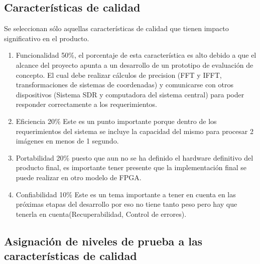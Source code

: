\documentclass[
11pt, %
]{charter}
\begin{document}
\subsection{Características de calidad}
\label{sec:org307bb59}

Se seleccionan sólo aquellas características de calidad que tienen impacto significativo en el producto.

\begin{enumerate}
\item Funcionalidad 50\%, el porcentaje de esta característica es alto debido a que el alcance del proyecto apunta a un desarrollo de un prototipo de evaluación de concepto. El cual debe realizar cálculos de precision (FFT y IFFT, transformaciones de sistemas de coordenadas) y comunicarse con otros dispositivos (Sistema SDR y computadora del sistema central) para poder responder correctamente a los requerimientos.
\item Eficiencia 20\% Este es un punto importante porque dentro de los requerimientos del sistema se incluye la capacidad del mismo para procesar 2 imágenes en menos de 1 segundo.
\item Portabilidad 20\% puesto que aun no se ha definido el hardware definitivo del producto final, es importante tener presente que la implementación final se puede realizar en otro modelo de FPGA.
\item Confiabilidad 10\% Este es un tema importante a tener en cuenta en las próximas etapas del desarrollo por eso no tiene tanto peso pero hay que tenerla en cuenta(Recuperabilidad, Control de errores).
\end{enumerate}


\subsection{Asignación de niveles de prueba a las características de calidad}
\label{sec:org94bc543}
\end{document}
